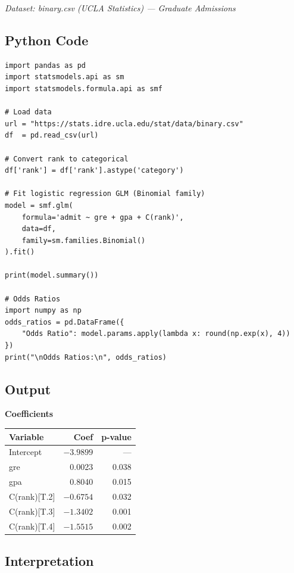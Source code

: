 \documentclass[12pt,a4paper]{article}
\begin{document}
\textit{Dataset: binary.csv (UCLA Statistics) — Graduate Admissions}

\subsection{Python Code}

\begin{lstlisting}
import pandas as pd
import statsmodels.api as sm
import statsmodels.formula.api as smf

# Load data
url = "https://stats.idre.ucla.edu/stat/data/binary.csv"
df  = pd.read_csv(url)

# Convert rank to categorical
df['rank'] = df['rank'].astype('category')

# Fit logistic regression GLM (Binomial family)
model = smf.glm(
    formula='admit ~ gre + gpa + C(rank)',
    data=df,
    family=sm.families.Binomial()
).fit()

print(model.summary())

# Odds Ratios
import numpy as np
odds_ratios = pd.DataFrame({
    "Odds Ratio": model.params.apply(lambda x: round(np.exp(x), 4))
})
print("\nOdds Ratios:\n", odds_ratios)
\end{lstlisting}

\subsection{Output}

\begin{outputbox}
\textbf{Coefficients}
\begin{center}
\begin{tabular}{lrr}
\toprule
Variable       & Coef    & p-value \\
\midrule
Intercept      & $-3.9899$ & ---   \\
gre            & 0.0023  & 0.038  \\
gpa            & 0.8040  & 0.015  \\
C(rank)[T.2]   & $-0.6754$ & 0.032 \\
C(rank)[T.3]   & $-1.3402$ & 0.001 \\
C(rank)[T.4]   & $-1.5515$ & 0.002 \\
\bottomrule
\end{tabular}
\end{center}
\end{outputbox}

\subsection{Interpretation}
\end{document}
